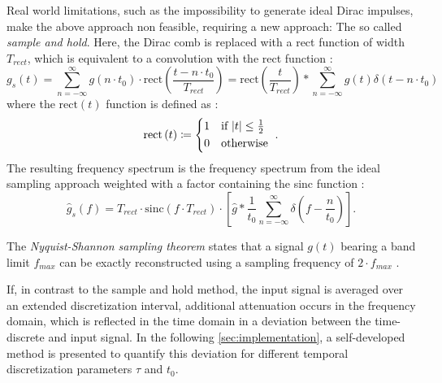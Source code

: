 Real world limitations, such as the impossibility to generate ideal Dirac impulses, make the above approach non feasible, requiring a new approach: The so called \emph{sample and hold}. Here, the Dirac comb is replaced with a rect function of width $T_{rect}$, which is equivalent to a convolution with the rect function \cite{engelberg2008,ceschi2017}:
\begin{equation} \label{eq:sample-and-hold-time}
	g_s\left(t\right) = \sum_{n = -\infty}^{\infty} g\left(n \cdot t_0\right) \cdot \text{rect}\left(\frac{t - n \cdot t_0}{T_{rect}}\right) = \text{rect}\left(\frac{t}{T_{rect}}\right) * \sum_{n = -\infty}^{\infty} g\left(t\right)\delta\left(t - n \cdot t_0\right)
\end{equation}
where the $\text{rect}\left(t\right)$ function is defined as \cite{engelberg2008,ceschi2017}:
\begin{equation}
\text{rect}\left(t\right) \coloneqq
\begin{cases*}
1 & if $\abs{t} \leq \frac{1}{2}$ \\
0 & otherwise
\end{cases*}.
\end{equation}
The resulting frequency spectrum is the frequency spectrum from the ideal sampling approach weighted with a factor containing the sinc function \cite{engelberg2008,ceschi2017}:
\begin{equation} \label{eq:sample-and-hold-frequency}
	\hat{g}_s\left(f\right) = T_{rect} \cdot \text{sinc}\left(f \cdot T_{rect}\right) \cdot \left[\hat{g} * \frac{1}{t_0}\sum_{n = -\infty}^{\infty}\delta\left(f - \frac{n}{t_0}\right)\right].
\end{equation}

The \emph{Nyquist-Shannon sampling theorem} states that a signal $g\left(t\right)$ bearing a band limit $f_{max}$ can be exactly reconstructed using a sampling frequency of $2 \cdot f_{max}$ \cite{Shannon1949}.

If, in contrast to the sample and hold method, the input signal is averaged over an extended discretization interval, additional attenuation occurs in the frequency domain, which is reflected in the time domain in a deviation between the time-discrete and input signal. In the following \cref{sec:implementation}, a self-developed method is presented to quantify this deviation for different temporal discretization parameters $\tau$ and $t_0$.
